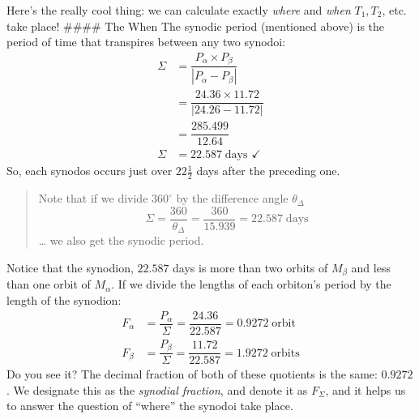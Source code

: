 \documentclass[
  letterpaper,
]{book}
\begin{document}
Here's the really cool thing: we can calculate exactly \emph{where} and
\emph{when} \(T_1, T_2\), etc. take place! \#\#\#\# The When The synodic
period (mentioned above) is the period of time that transpires between
any two synodoi: \[
\begin{equation}
\begin{split}
\Sigma &= \dfrac{P_\alpha \times P_\beta}{|P_\alpha - P_\beta|} \\
&= \dfrac{24.36 \times 11.72}{|24.26 - 11.72|} \\
&= \dfrac{285.499}{12.64} \\
\Sigma &= 22.587\; \text{days ✓}
\end{split}
\end{equation}
\] So, each synodos occurs just over \(22\frac{1}{2}\) days after the
preceding one.

\begin{quote}
Note that if we divide \(360^\circ\) by the difference angle
\(\theta_\Delta\) \[
\Sigma = \dfrac{360}{\theta_\Delta} = \dfrac{360}{15.939}= 22.587\; \text{days}
\] \ldots{} we also get the synodic period.
\end{quote}

Notice that the synodion, \(22.587\) days is more than two orbits of
\(M_\beta\) and less than one orbit of \(M_\alpha\). If we divide the
lengths of each orbiton's period by the length of the synodion: \[
\begin{align}
F_\alpha &= \dfrac{P_\alpha}{\Sigma} = \dfrac{24.36}{22.587} = 0.9272\; \text{orbit}\\
F_\beta &= \dfrac{P_\beta}{\Sigma} = \dfrac{11.72}{22.587} = 1.9272\; \text{orbits}
\end{align}
\] Do you see it? The decimal fraction of both of these quotients is the
same: \(0.9272\). We designate this as the \emph{synodial fraction}, and
denote it as \(F_\Sigma\), and it helps us to answer the question of
``where'' the synodoi take place.
\end{document}
